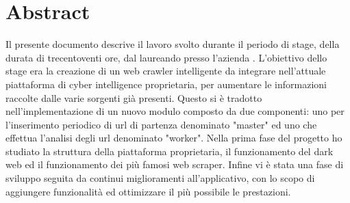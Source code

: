 
\cleardoublepage
{}
{}
\begingroup
\let\clearpage\relax
\let\cleardoublepage\relax
\let\cleardoublepage\relax

\chapter*{Abstract}

Il presente documento descrive il lavoro svolto durante il periodo di stage, della durata di trecentoventi ore, dal laureando \myName{} presso l'azienda \myCompany{} \myCompanyRag{}.
L'obiettivo dello stage era la creazione di un web crawler intelligente da integrare nell’attuale piattaforma di cyber intelligence proprietaria, per aumentare le informazioni raccolte dalle varie sorgenti già presenti. Questo si è tradotto nell'implementazione di un nuovo modulo composto da due componenti: uno per l'inserimento periodico di url di partenza denominato "master" ed uno che effettua l'analisi degli url denominato "worker". \newline{}
Nella prima fase del progetto ho studiato la struttura della piattaforma proprietaria, il funzionamento del dark web ed il funzionamento dei più famosi web scraper. Infine vi è stata una fase di sviluppo seguita da continui miglioramenti all'applicativo, con lo scopo di aggiungere funzionalità ed ottimizzare il più possibile le prestazioni.

%
%

\endgroup			

\vfill

